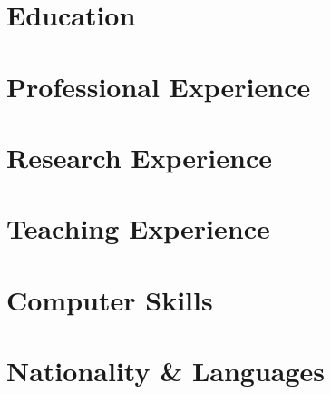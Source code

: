 \documentclass{resume}
\begin{document}
    

\section{Education}
    
    

\section{Professional Experience}
    

\section{Research Experience}
    

\section{Teaching Experience}
    
    

\section{Computer Skills}
    
    
    
    
\section{Nationality \& Languages}
	
\end{document}
